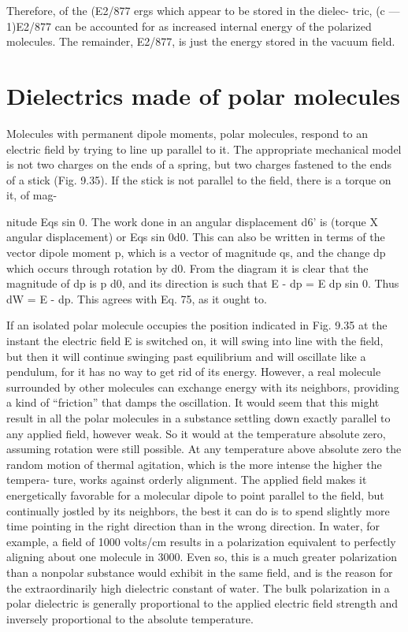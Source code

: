 {{{Therefore, of the (E2/877 ergs which appear to be stored in the dielec-
tric, (c  ---  1)E2/877 can be accounted for as increased internal energy
of the polarized molecules. The remainder, E2/877, is just the energy
stored in the vacuum field.

\section{Dielectrics made of polar molecules}

Molecules with permanent dipole moments, polar molecules,
respond to an electric field by trying to line up parallel to it. The
appropriate mechanical model is not two charges on the ends of a
spring, but two charges fastened to the ends of a stick (Fig. 9.35).
If the stick is not parallel to the field, there is a torque on it, of mag-

nitude Eqs sin 0. The work done in an angular displacement d6' is
(torque X angular displacement) or Eqs sin 0d0. This can also
be written in terms of the vector dipole moment p, which is a vector
of magnitude qs, and the change dp which occurs through rotation
by d0. From the diagram it is clear that the magnitude of dp is p d0,
and its direction is such that E - dp = E dp sin 0. Thus dW = E - dp.
This agrees with Eq. 75, as it ought to.

If an isolated polar molecule occupies the position indicated in
Fig. 9.35 at the instant the electric field E is switched on, it will swing
into line with the field, but then it will continue swinging past equilibrium
and will oscillate like a pendulum, for it has no way to get
rid of its energy. However, a real molecule surrounded by other
molecules can exchange energy with its neighbors, providing a kind
of ``friction'' that damps the oscillation. It would seem that this
might result in all the polar molecules in a substance settling down
exactly parallel to any applied field, however weak. So it would at
the temperature absolute zero, assuming rotation were still possible.
At any temperature above absolute zero the random motion of
thermal agitation, which is the more intense the higher the tempera-
ture, works against orderly alignment. The applied field makes it
energetically favorable for a molecular dipole to point parallel to
the field, but continually jostled by its neighbors, the best it can do
is to spend slightly more time pointing in the right direction than in
the wrong direction. In water, for example, a field of 1000 volts/cm
results in a polarization equivalent to perfectly aligning about one
molecule in 3000. Even so, this is a much greater polarization than
a nonpolar substance would exhibit in the same field, and is the
reason for the extraordinarily high dielectric constant of water. The
bulk polarization in a polar dielectric is generally proportional to
the applied electric field strength and inversely proportional to the
absolute temperature.

}}}

